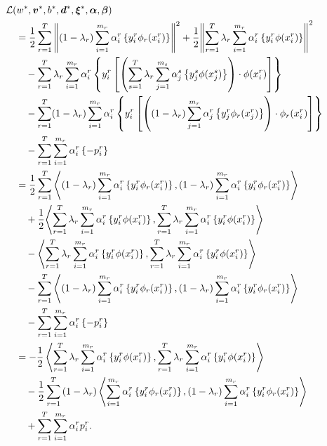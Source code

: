 \begin{equation}\nonumber
    \begin{aligned}
        & \mathcal{L}({{w}}^*, {\bm{v}}^*, {b}^*, {\bm{d}}^*, {\bm{\xi}}^*, \bm{\alpha}, \bm{\beta})\\
        &\quad=  \frac{1}{2} \sum_{r= 1}^T{\left\lVert (1 - \lambda_r) \sum_{i=1}^{m_r}  {\alpha_i^r} \left\lbrace y_i^r \phi_r({x}_i^r) \right\rbrace\right\rVert^2} + \frac{1}{2} {\left\lVert\sum_{r= 1}^T \lambda_r \sum_{i=1}^{m_r} {\alpha_i^r} \left\lbrace y_i^r \phi({x}_i^r) \right\rbrace\right\rVert}^2 \\
        &\qquad - \sum_{r= 1}^T \lambda_r \sum_{i=1}^{m_r} \alpha_i^r \left\lbrace y_{i}^r \left[ \left(\sum_{s= 1}^T \lambda_r \sum_{j=1}^{m_s} {\alpha_j^s} \left\lbrace y_j^s \phi({x}_j^s) \right\rbrace \right) \cdot \phi({x}_{i}^r) \right]  \right\rbrace \\
        &\qquad -  \sum_{r= 1}^T (1-\lambda_r) \sum_{i=1}^{m_r} \alpha_i^r \left\lbrace y_{i}^r \left[  \left((1-\lambda_r) \sum_{j=1}^{m_r} {\alpha_j^r} \left\lbrace y_j^r \phi_r({x}_j^r) \right\rbrace \right) \cdot \phi_r({x}_{i}^r)  \right]  \right\rbrace \\
        &\qquad -  \sum_{r= 1}^T \sum_{i=1}^{m_r} \alpha_i^r \left\lbrace - p_{i}^r  \right\rbrace \\
        &\quad=  \frac{1}{2} \sum_{r= 1}^T{\left\langle (1-\lambda_r)\sum_{i=1}^{m_r} {\alpha_i^r} \left\lbrace y_i^r \phi_r({x}_i^r) \right\rbrace, (1-\lambda_r)\sum_{i=1}^{m_r} {\alpha_i^r} \left\lbrace y_i^r \phi_r({x}_i^r) \right\rbrace \right\rangle} \\
        &\qquad + \frac{1}{2} {\left\langle \sum_{r= 1}^T \lambda_r \sum_{i=1}^{m_r} {\alpha_i^r} \left\lbrace y_i^r \phi({x}_i^r) \right\rbrace, \sum_{r= 1}^T \lambda_r \sum_{i=1}^{m_r} {\alpha_i^r} \left\lbrace y_i^r \phi({x}_i^r) \right\rbrace \right\rangle} \\
        &\qquad - \left\langle  \sum_{r= 1}^T \lambda_r \sum_{i=1}^{m_r} {\alpha_i^r} \left\lbrace y_i^r \phi({x}_i^r) \right\rbrace,  \sum_{r= 1}^T \lambda_r \sum_{i=1}^{m_r} {\alpha_i^r} \left\lbrace y_i^r \phi({x}_i^r) \right\rbrace \right\rangle \\
        &\qquad -  \sum_{r= 1}^T {\left\langle (1-\lambda_r) \sum_{i=1}^{m_r} {\alpha_i^r} \left\lbrace y_i^r \phi_r({x}_i^r) \right\rbrace, (1-\lambda_r) \sum_{i=1}^{m_r} {\alpha_i^r} \left\lbrace y_i^r \phi_r({x}_i^r) \right\rbrace \right\rangle} \\
        &\qquad -  \sum_{r= 1}^T \sum_{i=1}^{m_r} \alpha_i^r \left\lbrace - p_{i}^r  \right\rbrace \\
        &\quad= - \frac{1}{2} \left\langle  \sum_{r= 1}^T  \lambda_r \sum_{i=1}^{m_r} {\alpha_i^r} \left\lbrace y_i^r \phi({x}_i^r) \right\rbrace,  \sum_{r= 1}^T \lambda_r \sum_{i=1}^{m_r} {\alpha_i^r} \left\lbrace y_i^r \phi({x}_i^r) \right\rbrace \right\rangle \\
        &\qquad - \frac{1}{2} \sum_{r= 1}^T {(1-\lambda_r) \left\langle \sum_{i=1}^{m_r} {\alpha_i^r} \left\lbrace y_i^r \phi_r({x}_i^r) \right\rbrace, (1-\lambda_r) \sum_{i=1}^{m_r} {\alpha_i^r} \left\lbrace y_i^r \phi_r({x}_i^r) \right\rbrace \right\rangle} \\
        &\qquad +  \sum_{r= 1}^T \sum_{i=1}^{m_r} \alpha_i^r  p_{i}^r .
    \end{aligned}
\end{equation}
